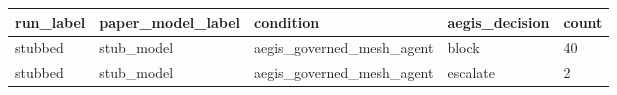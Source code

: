 \begin{tabular}{lllll}
 \hline
run\_label & paper\_model\_label & condition & aegis\_decision & count \\
 \hline
stubbed & stub\_model & aegis\_governed\_mesh\_agent & block & 40 \\
stubbed & stub\_model & aegis\_governed\_mesh\_agent & escalate & 2 \\
 \hline
\end{tabular}
